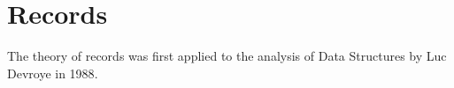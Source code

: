 \chapter{Records}

The theory of records was first applied to the analysis of Data
Structures by Luc Devroye in 1988\cite{Devroye:1988}.
